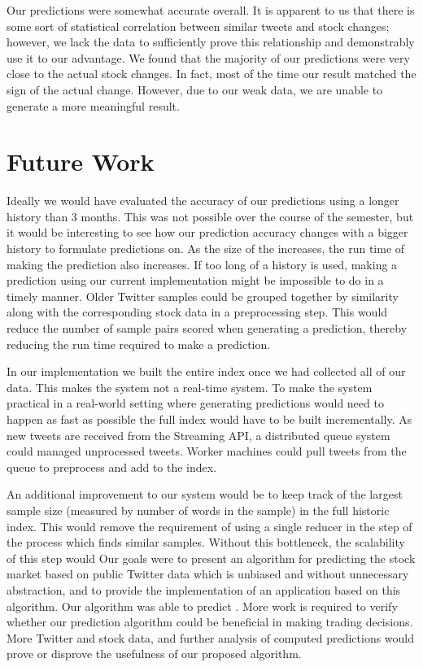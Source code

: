 \documentclass[twocolumn]{article}
\begin{document}
Our predictions were somewhat accurate overall. It is apparent to us that there is some sort of statistical correlation between similar tweets and stock changes; however, we lack the data to sufficiently prove this relationship and demonstrably use it to our advantage. We found that the majority of our predictions were very close to the actual stock changes. In fact, most of the time our result matched the sign of the actual change. However, due to our weak data, we are unable to generate a more meaningful result. 

\section{Future Work}
Ideally we would have evaluated the accuracy of our predictions using a longer history than 3 months. This was not possible over the course of the semester, but it would be interesting to see how our prediction accuracy changes with a bigger history to formulate predictions on. As the size of the increases, the run time of making the prediction also increases. If too long of a history is used, making a prediction using our current implementation might be impossible to do in a timely manner. Older Twitter samples could be grouped together by similarity along with the corresponding stock data in a preprocessing step. This would reduce the number of sample pairs scored when generating a prediction, thereby reducing the run time required to make a prediction.

In our implementation we built the entire index once we had collected all of our data. This makes the system not a real-time system. To make the system practical in a real-world setting where generating predictions would need to happen as fast as possible the full index would have to be built incrementally. As new tweets are received from the Streaming API, a distributed queue system could managed unprocessed tweets. Worker machines could pull tweets from the queue to preprocess and add to the index.

An additional improvement to our system would be to keep track of the largest sample size (measured by number of words in the sample) in the full historic index. This would remove the requirement of using a single reducer in the step of the process which finds similar samples. Without this bottleneck, the scalability of this step would Our goals were to present an algorithm for predicting the stock market based on public Twitter data which is unbiased and without unnecessary abstraction, and to provide the implementation of an application based on this algorithm. Our algorithm was able to predict . More work is required to verify whether our prediction algorithm could be beneficial in making trading decisions. More Twitter and stock data, and further analysis of computed predictions would prove or disprove the usefulness of our proposed algorithm.
\end{document}
